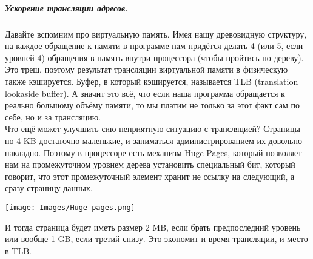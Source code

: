 \documentclass{article}
\begin{document}
    \subparagraph{Ускорение трансляции адресов.}
    Давайте вспомним про виртуальную память. Имея нашу древовидную структуру, на каждое обращение к памяти в программе нам придётся делать 4 (или 5, если уровней 4) обращения в память внутри процессора (чтобы пройтись по дереву). Это треш, поэтому результат трансляции виртуальной памяти в физическую также кэшируется. Буфер, в который кэшируется, называется TLB (translation lookaside buffer). А значит это всё, что если наша программа обращается к реально большому объёму памяти, то мы платим не только за этот факт сам по себе, но и за трансляцию.\\
    Что ещё может улучшить сию неприятную ситуацию с трансляцией? Страницы по 4 KB достаточно маленькие, и заниматься администрированием их довольно накладно. Поэтому в процессоре есть механизм Huge Pages, который позволяет нам на промежуточном уровнем дерева установить специальный бит, который говорит, что этот промежуточный элемент хранит не ссылку на следующий, а сразу страницу данных.
    \begin{center}
        \texttt{[image: Images/Huge pages.png]}
    \end{center}
    И тогда страница будет иметь размер 2 MB, если брать предпоследний уровень или вообще 1 GB, если третий снизу. Это экономит и время трансляции, и место в TLB.
\end{document}
